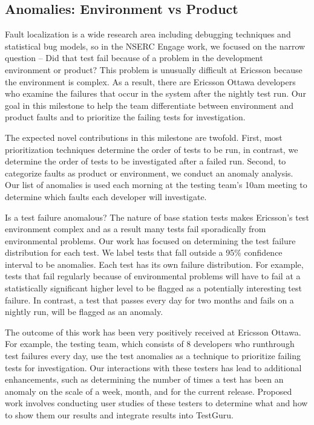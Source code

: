 \subsection{Anomalies: Environment vs Product}

Fault localization is a wide research area including debugging techniques and statistical bug models, so in the NSERC Engage work, we focused on the narrow question -- Did that test fail because of a problem in the development environment or product? This problem is unusually difficult at Ericsson because the environment is complex. As a result, there are  Ericsson Ottawa developers who examine the failures that occur in the system after the nightly test run. Our goal in this milestone to help the team differentiate between environment and product faults and to prioritize the failing tests for investigation.

The expected novel contributions in this milestone are twofold. First, most prioritization techniques determine the order of tests to be run, in contrast, we determine the order of tests to be investigated after a failed run. Second, to categorize faults as product or environment, we conduct an anomaly analysis. Our list of anomalies is used each morning at the testing team's 10am meeting to determine which faults each developer will investigate. 

Is a test failure anomalous? The nature of base station tests makes Ericsson's test environment complex and as a result many tests fail sporadically from environmental problems. Our work has focused on determining the test failure distribution for each test. We label tests that fall outside a 95\% confidence interval to be anomalies. Each test has its own failure distribution. For example, tests that fail regularly because of environmental problems will have to fail at a statistically significant higher level to be flagged as a potentially interesting test failure. In contrast, a test that passes every day for two months and fails on a nightly run, will be flagged as an anomaly. 

The outcome of this work has been very positively received at Ericsson Ottawa. For example, the testing team, which consists of 8 developers who runthrough test failures every day, use the test anomalies as a technique to prioritize failing tests for investigation. Our interactions with these testers has lead to additional enhancements, such as determining the number of times a test has been an anomaly on the scale of a week, month, and for the current release. Proposed work involves conducting user studies of these testers to determine what and how to show them our results and integrate results into TestGuru. 

